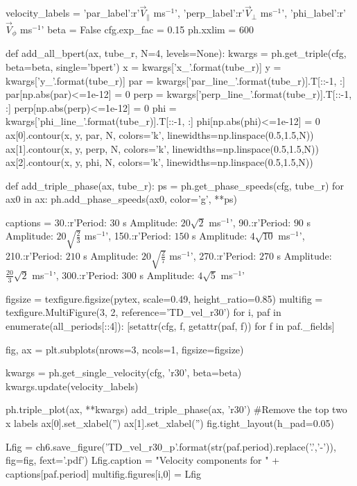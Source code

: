 \begin{pycode}[chapter6]

velocity_labels = {'par_label':r'$ \vec{V}_\parallel$ ms$^{-1}$', 
                   'perp_label':r'$ \vec{V}_\perp$ ms$^{-1}$',
                   'phi_label':r'$ \vec{V}_\phi$ ms$^{-1}$'}
beta = False
cfg.exp_fac = 0.15
ph.xxlim = 600

def add_all_bpert(ax, tube_r, N=4, levels=None):
    kwargs = ph.get_triple(cfg, beta=beta, single='bpert')
    x = kwargs['x_{}'.format(tube_r)]
    y = kwargs['y_{}'.format(tube_r)]
    par = kwargs['par_line_{}'.format(tube_r)].T[::-1, :]
    par[np.abs(par)<=1e-12] = 0
    perp = kwargs['perp_line_{}'.format(tube_r)].T[::-1, :]
    perp[np.abs(perp)<=1e-12] = 0
    phi = kwargs['phi_line_{}'.format(tube_r)].T[::-1, :]
    phi[np.abs(phi)<=1e-12] = 0
    ax[0].contour(x, y, par, N, colors='k', linewidths=np.linspace(0.5,1.5,N))
    ax[1].contour(x, y, perp, N, colors='k', linewidths=np.linspace(0.5,1.5,N))
    ax[2].contour(x, y, phi, N, colors='k', linewidths=np.linspace(0.5,1.5,N))	                   

def add_triple_phase(ax, tube_r):
    ps = ph.get_phase_speeds(cfg, tube_r)
    for ax0 in ax:
        ph.add_phase_speeds(ax0, color='g', **ps)

captions = {30.:r'Period: $30$ s Amplitude: $20\sqrt{2}$ ms$^{-1}$',
            90.:r'Period: $90$ s Amplitude: $20\sqrt{\frac{2}{3}}$ ms$^{-1}$',
            150.:r'Period: $150$ s Amplitude: $4\sqrt{10}$ ms$^{-1}$',
            210.:r'Period: $210$ s Amplitude: $20\sqrt{\frac{2}{7}}$ ms$^{-1}$',
            270.:r'Period: $270$ s Amplitude: $\frac{20}{3}\sqrt{2}$ ms$^{-1}$',
            300.:r'Period: $300$ s Amplitude: $4\sqrt{5}$ ms$^{-1}$'}

figsize = texfigure.figsize(pytex, scale=0.49, height_ratio=0.85)
multifig = texfigure.MultiFigure(3, 2, reference='TD_vel_r30')
for i, paf in enumerate(all_periods[::4]):
    [setattr(cfg, f, getattr(paf, f)) for f in paf._fields]

    fig, ax = plt.subplots(nrows=3, ncols=1, figsize=figsize)
    
    kwargs = ph.get_single_velocity(cfg, 'r30', beta=beta)
    kwargs.update(velocity_labels)
    
    ph.triple_plot(ax, **kwargs)
    add_triple_phase(ax, 'r30')
    #Remove the top two x labels
    ax[0].set_xlabel('')
    ax[1].set_xlabel('')
    fig.tight_layout(h_pad=0.05)
    
    Lfig = ch6.save_figure('TD_vel_r30_p{}'.format(str(paf.period).replace('.','-')), fig=fig, fext='.pdf')
    Lfig.caption = "Velocity components for " + captions[paf.period]
    multifig.figures[i,0] = Lfig


\end{pycode}
